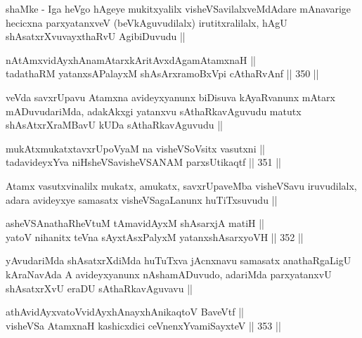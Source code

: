 \begin{artha}
shaMke - Iga heVgo hAgeye mukitxyalilx visheVSavilalxveMdAdare
mAnavarige hecicxna parxyatanxveV (beVkAguvudilalx) irutitxralilalx,
hAgU shAsatxrXvuvayxthaRvU AgibiDuvudu ||
\end{artha}


\begin{shl}
nA\s \s tAmxvidAyxhAnamAtarxkAritAvxdAgamAtamxnaH || \\
tadathaRM yatanxsAPalayxM shAsArxramoBxV\s pi cAthaRvAnf ||  350 ||  
\end{shl}

\begin{artha}
veVda savxrUpavu Atamxna avideyxyanunx biDisuva kAyaRvanunx mAtarx
mADuvudariMda, adakAkxgi yatanxvu sAthaRkavAguvudu matutx
shAsAtxrXraMBavU kUDa sAthaRkavAguvudu ||
\end{artha}

\begin{shl}
mukAtxmukatxtavxrUpoV\s yaM na visheVSoV\s sitx vasutxni || \\
tadavideyxYva niHsheVSavisheVSANAM parxsUtikaqtf ||  351 ||  
\end{shl}

\begin{artha}
Atamx vasutxvinalilx mukatx, amukatx, savxrUpaveMba visheVSavu
iruvudilalx, adara avideyxye samasatx visheVSagaLanunx huTiTxsuvudu ||
\end{artha}

\begin{shl}
asheVSAnathaRheVtuM tAmavidAyxM shAsarxjA matiH || \\
yatoV nihanitx teVna sAyxtAsxPalyxM yatanxshAsarxyoVH ||  352 ||  
\end{shl}

\begin{artha}
yAvudariMda shAsatxrXdiMda huTuTxva jAcnxnavu samasatx anathaRgaLigU
kAraNavAda A avideyxyanunx nAshamADuvudo, adariMda parxyatanxvU
shAsatxrXvU eraDU sAthaRkavAguvavu ||
\end{artha}


\begin{shl}
athAvidAyxvatoV\s vidAyxhAnayxhAnikaqtoV BaveVtf || \\
visheVSa AtamxnaH kashicxdici ceVnenxYvamiSayxteV ||  353 ||  
\end{shl}

